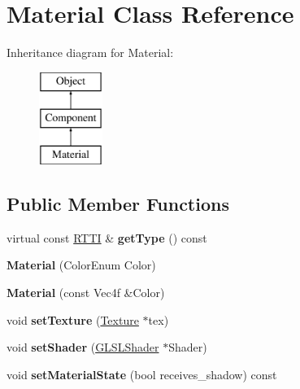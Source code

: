 \hypertarget{class_material}{
\section{Material Class Reference}
\label{class_material}
}
Inheritance diagram for Material:\begin{figure}[H]
\begin{center}
\leavevmode
\includegraphics[height=3.000000cm]{class_material}
\end{center}
\end{figure}
\subsection*{Public Member Functions}
\begin{DoxyCompactItemize}
\item 
\hypertarget{class_material_a1acc2b274cb26a7596d7ad431d44a85b}{
virtual const \hyperlink{class_r_t_t_i}{RTTI} \& {\bfseries getType} () const }
\label{class_material_a1acc2b274cb26a7596d7ad431d44a85b}

\item 
\hypertarget{class_material_a85bc5c4fadca145531972bc2238a62fa}{
{\bfseries Material} (ColorEnum Color)}
\label{class_material_a85bc5c4fadca145531972bc2238a62fa}

\item 
\hypertarget{class_material_a2b1512217db95dca5fb753244f942fe5}{
{\bfseries Material} (const Vec4f \&Color)}
\label{class_material_a2b1512217db95dca5fb753244f942fe5}

\item 
\hypertarget{class_material_af5b80bf73b7ea87a3d9d3855596be1f4}{
void {\bfseries setTexture} (\hyperlink{class_texture}{Texture} $\ast$tex)}
\label{class_material_af5b80bf73b7ea87a3d9d3855596be1f4}

\item 
\hypertarget{class_material_a3f618cc74964d2e3af42b843d5d4527b}{
void {\bfseries setShader} (\hyperlink{class_g_l_s_l_shader}{GLSLShader} $\ast$Shader)}
\label{class_material_a3f618cc74964d2e3af42b843d5d4527b}

\item 
\hypertarget{class_material_a0c1158aadbd8a977a59befef87310cb5}{
void {\bfseries setMaterialState} (bool receives\_\-shadow) const }
\label{class_material_a0c1158aadbd8a977a59befef87310cb5}

\end{DoxyCompactItemize}
